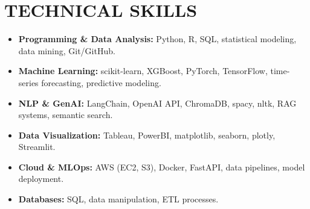 \documentclass[a4paper,9pt]{extarticle}
\begin{document}
\section*{TECHNICAL SKILLS}

\begin{itemize}[leftmargin=0.5cm, label={}]
    \item \textbf{Programming \& Data Analysis:} Python, R, SQL, statistical modeling, data mining, Git/GitHub. \\
    
    \item \textbf{Machine Learning:} scikit-learn, XGBoost, PyTorch, TensorFlow, time-series forecasting, predictive modeling. \\
    
    \item \textbf{NLP \& GenAI:} LangChain, OpenAI API, ChromaDB, spacy, nltk, RAG systems, semantic search. \\
    
    \item \textbf{Data Visualization:} Tableau, PowerBI, matplotlib, seaborn, plotly, Streamlit. \\
    
    \item \textbf{Cloud \& MLOps:} AWS (EC2, S3), Docker, FastAPI, data pipelines, model deployment. \\
    
    \item \textbf{Databases:} SQL, data manipulation, ETL processes.
\end{itemize}

\end{document}
